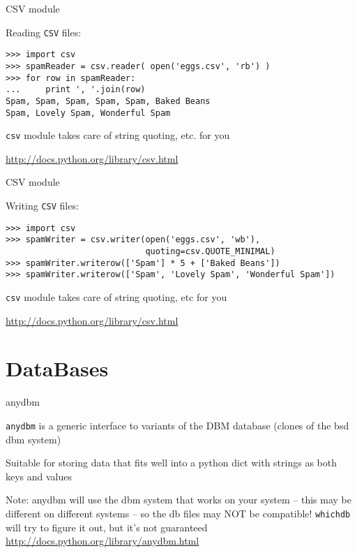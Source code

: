\documentclass{beamer}
\begin{document}
\begin{frame}[fragile]{CSV module}

{\Large Reading \verb|CSV| files:}

\begin{verbatim}
>>> import csv
>>> spamReader = csv.reader( open('eggs.csv', 'rb') )
>>> for row in spamReader:
...     print ', '.join(row)
Spam, Spam, Spam, Spam, Spam, Baked Beans
Spam, Lovely Spam, Wonderful Spam
\end{verbatim}

\vfill
{\verb|csv| module takes care of string quoting, etc. for you}

\vfill
\url{http://docs.python.org/library/csv.html}
\end{frame}



\begin{frame}[fragile]{CSV module}

{\Large Writing \verb|CSV| files:}

\begin{verbatim}
>>> import csv
>>> spamWriter = csv.writer(open('eggs.csv', 'wb'), 
                            quoting=csv.QUOTE_MINIMAL)
>>> spamWriter.writerow(['Spam'] * 5 + ['Baked Beans'])
>>> spamWriter.writerow(['Spam', 'Lovely Spam', 'Wonderful Spam'])
\end{verbatim}

\vfill
{\verb|csv| module takes care of string quoting, etc for you}

\vfill
\url{http://docs.python.org/library/csv.html}
\end{frame}




\section{DataBases} 

\begin{frame}[fragile]{anydbm}

\vfill
{\Large \verb|anydbm| is a generic interface to variants of the DBM database (clones of the bsd dbm system)}

{\Large Suitable for storing data that fits well into a python dict with strings as both keys and values}

{\Large Note: anydbm will use the dbm system that works on your system --
        this may be different on different systems -- so the db files may NOT
        be compatible! \verb|whichdb| will try to figure it out, but it's not
        guaranteed}
\vfill
\url{http://docs.python.org/library/anydbm.html}
\end{frame} 
\end{document}
